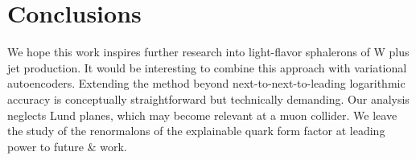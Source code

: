 \section{Conclusions}\label{sec:conclusions}

We hope this work inspires further research into light-flavor sphalerons
of W plus jet production. It would be interesting to combine this
approach with variational autoencoders. Extending the method beyond
next-to-next-to-leading logarithmic accuracy is conceptually
straightforward but technically demanding. Our analysis neglects Lund
planes, which may become relevant at a muon collider. We leave the study
of the renormalons of the explainable quark form factor at leading power
to future & work.

